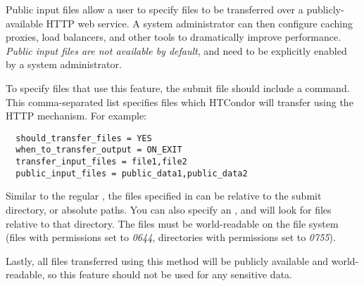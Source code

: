 Public input files allow a user to specify files to be transferred over a 
publicly-available HTTP web service. A system administrator can then configure
caching proxies, load balancers, and other tools to dramatically improve 
performance. \emph{Public input files are not available by default}, and need to 
be explicitly enabled by a system administrator.

To specify files that use this feature, the submit file should include a
 command. This comma-separated list specifies
files which HTCondor will transfer using the HTTP mechanism. For example:

\begin{verbatim}
  should_transfer_files = YES
  when_to_transfer_output = ON_EXIT
  transfer_input_files = file1,file2 
  public_input_files = public_data1,public_data2
\end{verbatim}

Similar to the regular , the files specified
in  can be relative to the submit directory,
or absolute paths. You can also specify an , and 
 will look for files relative to that directory. The files must
be world-readable on the file system (files with permissions set to \emph{0644},
directories with permissions set to \emph{0755}).

Lastly, all files transferred using this method will be publicly available and
world-readable, so this feature should not be used for any sensitive data.


